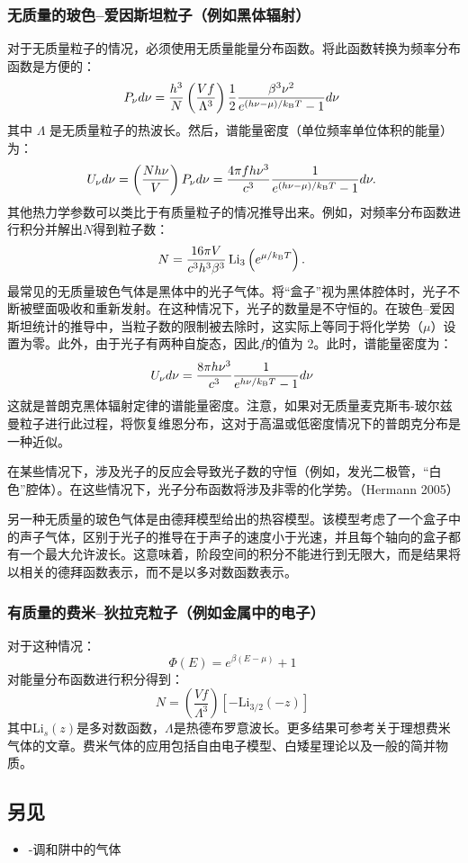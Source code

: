 \subsubsection{无质量的玻色–爱因斯坦粒子（例如黑体辐射）}  
对于无质量粒子的情况，必须使用无质量能量分布函数。将此函数转换为频率分布函数是方便的：
\[
P_{\nu} d\nu = \frac{h^3}{N} \left( \frac{Vf}{\Lambda^3} \right) \frac{1}{2} \frac{\beta^3 \nu^2}{e^{(h\nu - \mu) / k_{\rm B} T} - 1} d\nu~
\]
其中 \( \Lambda \) 是无质量粒子的热波长。然后，谱能量密度（单位频率单位体积的能量）为：
\[
U_{\nu} d\nu = \left( \frac{N h \nu}{V} \right) P_{\nu} d\nu = \frac{4 \pi f h \nu^3}{c^3} \frac{1}{e^{(h\nu - \mu) / k_{\rm B} T} - 1} d\nu.~
\]
其他热力学参数可以类比于有质量粒子的情况推导出来。例如，对频率分布函数进行积分并解出\(N\)得到粒子数：
\[
N = \frac{16 \pi V}{c^3 h^3 \beta^3} \, \mathrm{Li}_3 \left( e^{\mu / k_{\rm B} T} \right).~
\]
最常见的无质量玻色气体是黑体中的光子气体。将“盒子”视为黑体腔体时，光子不断被壁面吸收和重新发射。在这种情况下，光子的数量是不守恒的。在玻色–爱因斯坦统计的推导中，当粒子数的限制被去除时，这实际上等同于将化学势（\(\mu\)）设置为零。此外，由于光子有两种自旋态，因此\(f\)的值为 2。此时，谱能量密度为：
\[
U_{\nu} d\nu = \frac{8 \pi h \nu^3}{c^3} \frac{1}{e^{h\nu / k_{\rm B} T} - 1} d\nu~
\]
这就是普朗克黑体辐射定律的谱能量密度。注意，如果对无质量麦克斯韦-玻尔兹曼粒子进行此过程，将恢复维恩分布，这对于高温或低密度情况下的普朗克分布是一种近似。

在某些情况下，涉及光子的反应会导致光子数的守恒（例如，发光二极管，“白色”腔体）。在这些情况下，光子分布函数将涉及非零的化学势。（Hermann 2005）

另一种无质量的玻色气体是由德拜模型给出的热容模型。该模型考虑了一个盒子中的声子气体，区别于光子的推导在于声子的速度小于光速，并且每个轴向的盒子都有一个最大允许波长。这意味着，阶段空间的积分不能进行到无限大，而是结果将以相关的德拜函数表示，而不是以多对数函数表示。
\subsubsection{有质量的费米–狄拉克粒子（例如金属中的电子）}  
对于这种情况：
\[
\Phi(E) = e^{\beta (E - \mu)} + 1~
\]
对能量分布函数进行积分得到：
\[
N = \left( \frac{Vf}{\Lambda^3} \right) \left[ -\text{Li}_{3/2}(-z) \right]~
\]
其中\( \text{Li}_s(z) \)是多对数函数，\( \Lambda \)是热德布罗意波长。更多结果可参考关于理想费米气体的文章。费米气体的应用包括自由电子模型、白矮星理论以及一般的简并物质。
\subsection{另见} 
\begin{itemize}
\item -调和阱中的气体
\end{itemize}
